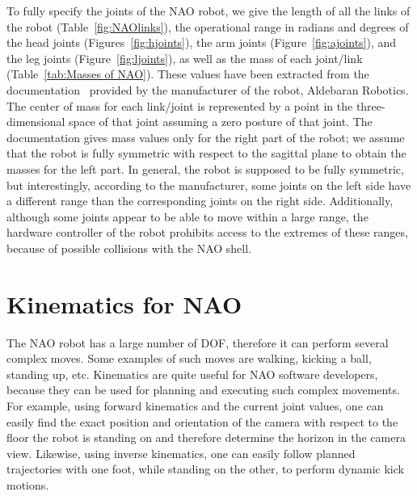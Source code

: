 To fully specify the joints of the NAO robot, we give the length of all the links of the robot (Table~\ref{fig:NAOlinks}), the operational range in radians and degrees of the head joints (Figures~\ref{fig:hjoints}), the arm joints (Figure~\ref{fig:ajoints}), and the leg joints (Figure~\ref{fig:ljoints}), as well as the mass of each joint/link (Table~\ref{tab:Masses of NAO}). These values have been extracted from the documentation~\cite{AldebaranNaoDoc} provided by the manufacturer of the robot, Aldebaran Robotics. The center of mass for each link/joint is represented by a point in the three-dimensional space of that joint assuming a zero posture of that joint. The documentation gives mass values only for the right part of the robot; we assume that the robot is fully symmetric with respect to the sagittal plane to obtain the masses for the left part. In general, the robot is supposed to be fully symmetric, but interestingly, according to the manufacturer, some joints on the left side have a different range than the corresponding joints on the right side. Additionally, although some joints appear to be able to move within a large range, the hardware controller of the robot prohibits access to the extremes of these ranges, because of possible collisions with the NAO shell.

\section{Kinematics for NAO}
The NAO robot has a large number of DOF, therefore it can perform several complex moves. Some examples of such moves are walking, kicking a ball, standing up, etc.  Kinematics are quite useful for NAO software developers, because they can be used for planning and executing such complex movements. For example, using forward kinematics and the current joint values, one can easily find the exact position and orientation of the camera with respect to the floor the robot is standing on and therefore determine the horizon in the camera view. Likewise, using inverse kinematics, one can easily follow planned trajectories with one foot, while standing on the other, to perform dynamic kick motions. 



